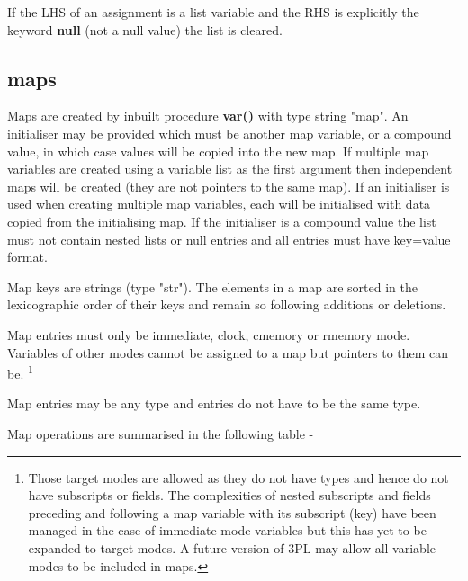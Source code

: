             If the LHS of an assignment is a list variable and the RHS is
            explicitly the keyword {\bf null} (not a null value) the list is
            cleared.






        \subsection{maps}\label{sec:ssecmaps}
        
            Maps are created by inbuilt procedure {\bf var()} with type string
            "map". An initialiser may be provided which must be another map
            variable, or a compound value, in which case values will be copied
            into the new map. If multiple map variables are created using a
            variable list as the first argument then independent maps will be
            created (they are not pointers to the same map). If an initialiser
            is used when creating multiple map variables, each will be
            initialised with data copied from the initialising map. If the
            initialiser is a compound value the list must not contain nested
            lists or null entries and all entries must have key=value format.
            
            Map keys are strings (type "str"). The elements in a map are sorted
            in the lexicographic order of their keys and remain so following
            additions or deletions.
            
            Map entries must only be immediate, clock, cmemory or rmemory mode.
            Variables of other modes cannot be assigned to a map but pointers to
            them can be. \footnote {Those target modes are allowed as they do
            not have types and hence do not have subscripts or fields. The
            complexities of nested subscripts and fields preceding and following
            a map variable with its subscript (key) have been managed in the
            case of immediate mode variables but this has yet to be expanded
            to target modes. A future version of 3PL may allow all variable
            modes to be included in maps.}
            
            Map entries may be any type and entries do not have to be
            the same type.
            
            Map operations are summarised in the following table -

